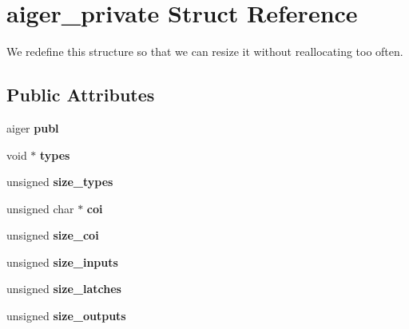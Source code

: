 \hypertarget{structaiger__private}{\section{aiger\-\_\-private Struct Reference}
\label{structaiger__private}
}


We redefine this structure so that we can resize it without reallocating too often.  


\subsection*{Public Attributes}
\begin{DoxyCompactItemize}
\item 
\hypertarget{structaiger__private_a62e0f340ce936099c0f3c2e8462eace6}{aiger {\bfseries publ}}\label{structaiger__private_a62e0f340ce936099c0f3c2e8462eace6}

\item 
\hypertarget{structaiger__private_aa5f1b5a8f1f56b66960e009c3a063765}{void $\ast$ {\bfseries types}}\label{structaiger__private_aa5f1b5a8f1f56b66960e009c3a063765}

\item 
\hypertarget{structaiger__private_ab28d3db4875f4253a8f4158a2e03d985}{unsigned {\bfseries size\-\_\-types}}\label{structaiger__private_ab28d3db4875f4253a8f4158a2e03d985}

\item 
\hypertarget{structaiger__private_af19494cd11aacd23960d494ece08b6a3}{unsigned char $\ast$ {\bfseries coi}}\label{structaiger__private_af19494cd11aacd23960d494ece08b6a3}

\item 
\hypertarget{structaiger__private_a174795cdd5c58e0cfcff8b54c0238dc3}{unsigned {\bfseries size\-\_\-coi}}\label{structaiger__private_a174795cdd5c58e0cfcff8b54c0238dc3}

\item 
\hypertarget{structaiger__private_a4c79579261f151eee561bacec9180f56}{unsigned {\bfseries size\-\_\-inputs}}\label{structaiger__private_a4c79579261f151eee561bacec9180f56}

\item 
\hypertarget{structaiger__private_aa269fc64c96f64d6c94ecfe1e8a1c30b}{unsigned {\bfseries size\-\_\-latches}}\label{structaiger__private_aa269fc64c96f64d6c94ecfe1e8a1c30b}

\item 
\hypertarget{structaiger__private_a88b69bd32c25c71cf36cd07bbf31407d}{unsigned {\bfseries size\-\_\-outputs}}\label{structaiger__private_a88b69bd32c25c71cf36cd07bbf31407d}


\end{DoxyCompactItemize}
